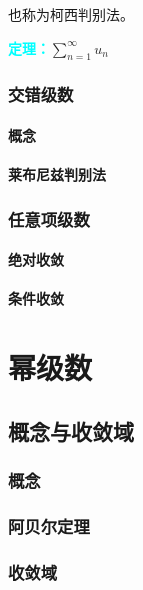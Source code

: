 \documentclass[UTF8, 12pt]{ctexart}
\begin{document}
也称为柯西判别法。

\textcolor{aqua}{\textbf{定理：}}$\sum\limits_{n=1}^\infty u_n$

\subsubsection{交错级数}

\paragraph{概念} \leavevmode \medskip

\paragraph{莱布尼兹判别法} \leavevmode \medskip

\subsubsection{任意项级数}

\paragraph{绝对收敛} \leavevmode \medskip

\paragraph{条件收敛} \leavevmode \medskip

\section{幂级数}

\subsection{概念与收敛域}

\subsubsection{概念}

\subsubsection{阿贝尔定理}

\subsubsection{收敛域}
\end{document}

